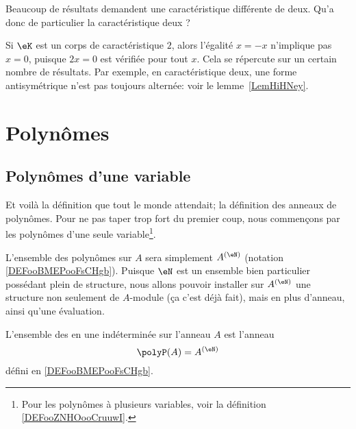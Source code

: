 Beaucoup de résultats demandent une caractéristique différente de deux. Qu'a donc de particulier la caractéristique deux ?

Si \( \eK\) est un corps de caractéristique \( 2\), alors l'égalité \( x=-x\) n'implique pas \( x=0\), puisque \( 2x=0\) est vérifiée pour tout \( x\). Cela se répercute sur un certain nombre de résultats. Par exemple, en caractéristique deux, une forme antisymétrique n'est pas toujours alternée: voir le lemme~\ref{LemHiHNey}.

\section{Polynômes}

\subsection{Polynômes d'une variable}

Et voilà la définition que tout le monde attendait; la définition des anneaux de polynômes. Pour ne pas taper trop fort du premier coup, nous commençons par les polynômes d'une seule variable\footnote{Pour les polynômes à plusieurs variables, voir la définition \ref{DEFooZNHOooCruuwI}.}.


L'ensemble des polynômes sur \( A\) sera simplement \( A^{(\eN)}\) (notation \ref{DEFooBMEPooFsCHgb}). Puisque \( \eN\) est un ensemble bien particulier possédant plein de structure, nous allons pouvoir installer sur \( A^{(\eN)}\) une structure non seulement de \( A\)-module (ça c'est déjà fait), mais en plus d'anneau, ainsi qu'une évaluation.
\begin{definition}      \label{DEFooFYZRooMikwEL}
	L'ensemble des  en une indéterminée sur l'anneau \( A\) est l'anneau
	\begin{equation}
		\polyP(A)=A^{(\eN)}
	\end{equation}
	défini en \ref{DEFooBMEPooFsCHgb}.
\end{definition}

